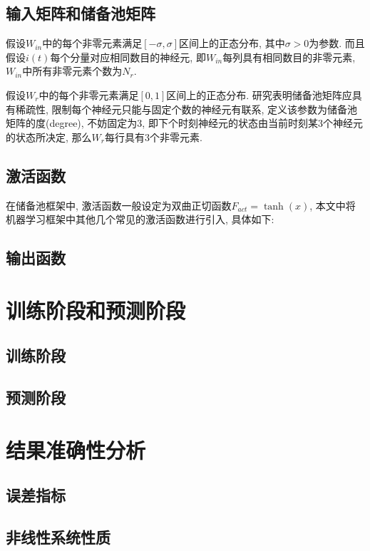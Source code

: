 \documentclass[notitlepage,cs4size,punct,oneside]{ctexrep}
\numberwithin{equation}{chapter}
\theoremstyle{mystyle}
\begin{document}
\subsection{输入矩阵和储备池矩阵}
假设$W_{in}$中的每个非零元素满足$[-\sigma, \sigma]$区间上的正态分布, 其中$\sigma>0$为参数. 
而且假设$i(t)$每个分量对应相同数目的神经元, 即$W_{in}$每列具有相同数目的非零元素, 
$W_{in}$中所有非零元素个数为$N_r$. 

假设$W_{r}$中的每个非零元素满足$[0, 1]$区间上的正态分布. 
研究表明储备池矩阵应具有稀疏性\cite{AGAP}, 限制每个神经元只能与固定个数的神经元有联系, 
定义该参数为储备池矩阵的度(degree), 不妨固定为3, 即下个时刻神经元的状态由当前时刻某3个神经元的状态所决定, 
那么$W_{r}$每行具有3个非零元素.  

\subsection{激活函数}

在储备池框架中, 激活函数一般设定为双曲正切函数$F_{act}=\tanh(x)$, 本文中将
机器学习框架中其他几个常见的激活函数进行引入, 具体如下:

\subsection{输出函数}

\section{训练阶段和预测阶段}

\subsection{训练阶段}

\subsection{预测阶段}

\section{结果准确性分析}

\subsection{误差指标}

\subsection{非线性系统性质}
\end{document}
